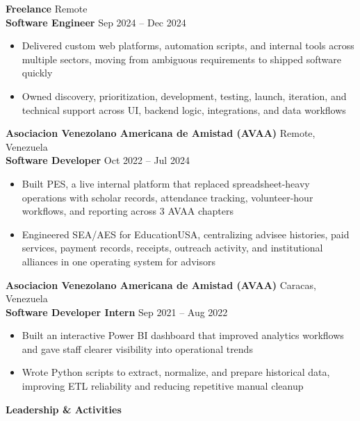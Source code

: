 \documentclass[11pt]{article}
\begin{document}
\vspace{12pt}

\textbf{Freelance} \hfill Remote \\
\textbf{Software Engineer} \hfill Sep 2024 -- Dec 2024
\begin{itemize}
    \item Delivered custom web platforms, automation scripts, and internal tools across multiple sectors, moving from ambiguous requirements to shipped software quickly
    \item Owned discovery, prioritization, development, testing, launch, iteration, and technical support across UI, backend logic, integrations, and data workflows
\end{itemize}

\vspace{12pt}

\textbf{Asociacion Venezolano Americana de Amistad (AVAA)} \hfill Remote, Venezuela \\
\textbf{Software Developer} \hfill Oct 2022 -- Jul 2024
\begin{itemize}
    \item Built PES, a live internal platform that replaced spreadsheet-heavy operations with scholar records, attendance tracking, volunteer-hour workflows, and reporting across 3 AVAA chapters
    \item Engineered SEA/AES for EducationUSA, centralizing advisee histories, paid services, payment records, receipts, outreach activity, and institutional alliances in one operating system for advisors
\end{itemize}

\vspace{12pt}

\textbf{Asociacion Venezolano Americana de Amistad (AVAA)} \hfill Caracas, Venezuela \\
\textbf{Software Developer Intern} \hfill Sep 2021 -- Aug 2022
\begin{itemize}
    \item Built an interactive Power BI dashboard that improved analytics workflows and gave staff clearer visibility into operational trends
    \item Wrote Python scripts to extract, normalize, and prepare historical data, improving ETL reliability and reducing repetitive manual cleanup
\end{itemize}

\begin{center}
    \textbf{Leadership \& Activities}
\end{center}
\end{document}
